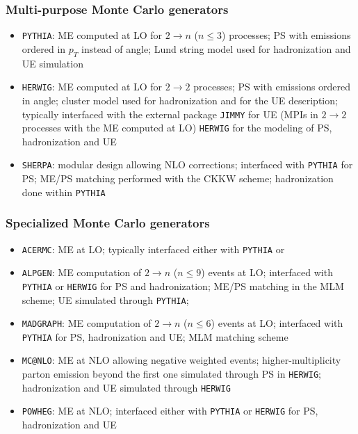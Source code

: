 \begin{frame}\frametitle{Multi-purpose Monte Carlo generators}
\centering\myskip

\begin{itemize}
\item \texttt{PYTHIA}: ME computed at LO for $2 \to n$ ($n\leq 3$) processes; PS with emissions
ordered in $p_T$ instead of angle; Lund string model used for hadronization
and UE simulation
\item \texttt{HERWIG}: ME computed at LO for $2 \to 2$ processes; PS with emissions ordered in angle;
cluster model used for hadronization and for the UE description; typically interfaced 
with the external package \texttt{JIMMY} for UE (MPIs in  $2 \to 2$ processes with the ME computed at LO)
\texttt{HERWIG} for the modeling of PS, hadronization and UE
\item \texttt{SHERPA}: modular design allowing NLO corrections; 
interfaced with \texttt{PYTHIA} for PS; ME/PS matching
performed with the CKKW scheme; hadronization done 
within \texttt{PYTHIA}
\end{itemize}

\end{frame}



\begin{frame}\frametitle{Specialized Monte Carlo generators}
\centering\myskip

\begin{itemize}
\item \texttt{ACERMC}: ME at LO; typically interfaced either with \texttt{PYTHIA} or 
\item \texttt{ALPGEN}: ME computation of $2 \to n$ ($n\leq 9$) events at LO; interfaced
with \texttt{PYTHIA} or \texttt{HERWIG} for PS and hadronization; ME/PS matching
in the MLM scheme; UE simulated through \texttt{PYTHIA};
\item \texttt{MADGRAPH}: ME computation of $2 \to n$ ($n\leq 6$) events at LO;
interfaced with \texttt{PYTHIA} for PS, hadronization and UE;
MLM matching scheme
\item \texttt{MC@NLO}: ME at NLO allowing negative weighted events; 
higher-multiplicity parton emission beyond the first one simulated through PS in \texttt{HERWIG};
hadronization and UE simulated through \texttt{HERWIG}
\item \texttt{POWHEG}: ME at NLO; interfaced either with \texttt{PYTHIA} or 
\texttt{HERWIG} for PS, hadronization and UE
\end{itemize}


\end{frame}



